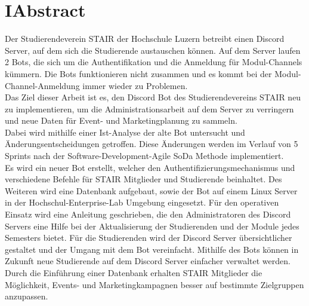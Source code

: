 \documentclass[a4paper, table]{article}
\begin{document}
\section*{I{\hspace*{1cm}}Abstract}
Der Studierendeverein STAIR der Hochschule Luzern betreibt einen Discord Server, auf dem sich die Studierende austauschen können. 
Auf dem Server laufen 2 Bots, die sich um die Authentifikation und die Anmeldung für Modul-Channels kümmern. 
Die Bots funktionieren nicht zusammen und es kommt bei der Modul-Channel-Anmeldung immer wieder zu Problemen.\\
Das Ziel dieser Arbeit ist es, den Discord Bot des Studierendevereins STAIR neu zu implementieren, um die Administrationsarbeit auf dem Server zu verringern und neue Daten für Event- und Marketingplanung zu sammeln.\\
Dabei wird mithilfe einer Ist-Analyse der alte Bot untersucht und Änderungsentscheidungen getroffen. 
Diese Änderungen werden im Verlauf von 5 Sprints nach der Software-Development-Agile \gls{SoDa} Methode implementiert.\\
Es wird ein neuer Bot erstellt, welcher den Authentifizierungsmechanismus und verschiedene Befehle für STAIR Mitglieder und Studierende beinhaltet. 
Des Weiteren wird eine Datenbank aufgebaut, sowie der Bot auf einem Linux Server in der Hochschul-Enterprise-Lab Umgebung eingesetzt. 
Für den operativen Einsatz wird eine Anleitung geschrieben, die den Administratoren des Discord Servers eine Hilfe bei der Aktualisierung der Studierenden und der Module jedes Semesters bietet. 
Für die Studierenden wird der Discord Server übersichtlicher gestaltet und der Umgang mit dem Bot vereinfacht. 
Mithilfe des Bots können in Zukunft neue Studierende auf dem Discord Server einfacher verwaltet werden. 
Durch die Einführung einer Datenbank erhalten STAIR Mitglieder die Möglichkeit, Events- und Marketingkampagnen besser auf bestimmte Zielgruppen anzupassen.\\\\
\end{document}
